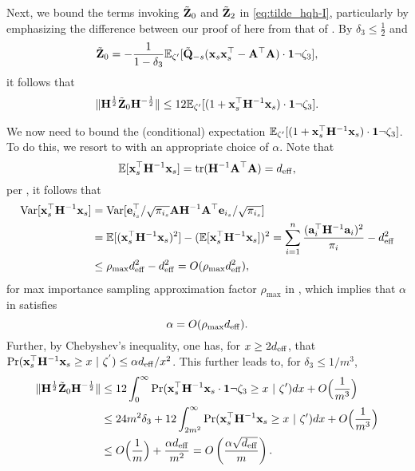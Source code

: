 \documentclass[11pt,a4paper]{article}
\begin{document}
Next, we bound the terms invoking $\tilde {\mathbf{Z}}_0$ and $\tilde {\mathbf{Z}}_2$ in \eqref{eq:tilde_hqh-I}, particularly by emphasizing the difference between our proof of  here from that of \citet{derezinski2021newtonless,derezinski2021sparse}. 
By $\delta_3\leq \frac{1}{2}$ and
\begin{align*}
  \tilde  {\mathbf{Z}}_0= -\frac{1}{1-\delta_3}{\mathbb{E}}_{\zeta'}[\tilde{\mathbf{Q}}_{-s}(\mathbf{x}_s\mathbf{x}_s^\top-\mathbf{A}^\top\mathbf{A})\cdot \mathbf{1}\neg\zeta_3],
\end{align*}
it follows that
\begin{align}
    \|\mathbf{H}^{\frac{1}{2}}\tilde{\mathbf{Z}}_0\mathbf{H}^{-\frac{1}{2}}\| \leq 12 {\mathbb{E}}_{\zeta'}[(1+\mathbf{x}_s^\top\mathbf{H}^{-1}\mathbf{x}_s)\cdot\mathbf{1} \neg\zeta_3]. \nonumber
\end{align}

We now need to bound the (conditional) expectation ${\mathbb{E}}_{\zeta'}[(1+\mathbf{x}_s^\top\mathbf{H}^{-1}\mathbf{x}_s)\cdot\mathbf{1} \neg\zeta_3]$.
To do this, we resort to  with an appropriate choice of $\alpha$.
Note that
\begin{equation*}
  {\mathbb{E}}[\mathbf{x}_s^\top\mathbf{H}^{-1}\mathbf{x}_s] = \operatorname{tr} (\mathbf{H}^{-1} \mathbf{A}^\top \mathbf{A}) = d_{\mathrm{eff}},
\end{equation*}
per , it follows that
\begin{align*}
\operatorname{Var}[\mathbf{x}_s^\top\mathbf{H}^{-1}\mathbf{x}_s]&=\operatorname{Var}[\mathbf{e}^\top_{i_s}/\sqrt{\pi_{i_s}}\mathbf{A}\mathbf{H}^{-1}\mathbf{A}^\top\mathbf{e}_{i_s}/\sqrt{\pi_{i_s}}]\nonumber\\
&={\mathbb{E}}[(\mathbf{x}_s^\top\mathbf{H}^{-1}\mathbf{x}_s)^2]-({\mathbb{E}}[\mathbf{x}_s^\top\mathbf{H}^{-1}\mathbf{x}_s])^2 = \sum^n_{i=1}\frac{(\mathbf{a}_i^\top\mathbf{H}^{-1}\mathbf{a}_i)^2}{\pi_i} -d_{\mathrm{eff}}^2\nonumber\\
   &\leq \rho_{\max}  d^2_{\mathrm{eff}}- d^2_{\mathrm{eff}} = O(\rho_{\max} d^2_{\mathrm{eff}}),
\end{align*}
for max  importance  sampling approximation factor $\rho_{\max}$ in , which implies that $\alpha$ in  satisfies
\begin{equation*}
  \alpha =  O( \rho_{\max} d_{\mathrm{eff}}).
\end{equation*}
Further, by Chebyshev's inequality, one has, for $x\geq 2d_{\mathrm{eff}}$, that $\Pr(\mathbf{x}_s^\top\mathbf{H}^{-1}\mathbf{x}_s\geq x ~|~\zeta^{'}) \leq \alpha d_{\mathrm{eff}}/x^2$.
This further leads to, for $\delta_3\leq 1/m^3$,
\begin{align*}
  \|\mathbf{H}^{\frac{1}{2}}\tilde{\mathbf{Z}}_0\mathbf{H}^{-\frac{1}{2}}\|&\leq 12   
  \int^\infty_0 \Pr(\mathbf{x}_s^\top\mathbf{H}^{-1}\mathbf{x}_s\cdot \mathbf{1}\neg\zeta_3\geq x~|~\zeta')dx +O\Big(\frac{1}{m^3}\Big)\nonumber\\
    &\leq 24m^2\delta_3+12\int^\infty_{2m^2}\Pr(\mathbf{x}_s^\top\mathbf{H}^{-1}\mathbf{x}_s\geq x~|~\zeta')dx +O\Big(\frac{1}{m^3}\Big)\nonumber\\
    &\leq O\Big(\frac{1}{m}\Big) +\frac{ \alpha d_{\mathrm{eff}}}{m^2}=O \left(\frac{ \alpha \sqrt{d_{\mathrm{eff}}}}{m} \right).
\end{align*}
\end{document}
